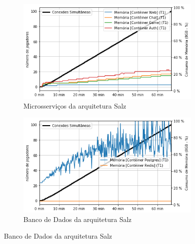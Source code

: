 \begin{figure}[htb!]
    \begin{subfigure}{.5\textwidth}
        \centering
        \includegraphics[width=.95\linewidth]{figuras/testes/s_mem_game.png}
        \caption{Microsserviços da arquitetura Salz}
        \label{fig:s_mem_game}
    \end{subfigure}%
    \begin{subfigure}{.5\textwidth}
        \centering
        \includegraphics[width=.95\linewidth]{figuras/testes/s_mem_db.png}
        \caption{Banco de Dados da arquitetura Salz}
        \label{fig:s_mem_db}
    \end{subfigure}%
    

\end{figure}
